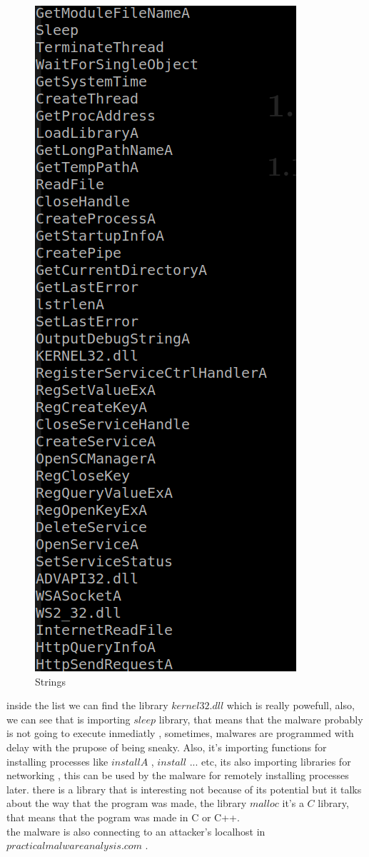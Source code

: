 \documentclass[12pt,letter]{article} %
\begin{document}
            \begin{figure}[h!]
                \centering
                \includegraphics[width=0.4\linewidth]{strings.png}
                \caption{Strings}
                \label{strings}
            \end{figure}
            inside the list we can find the library $ kernel32.dll  $ which is
            really powefull, also, we can see that is importing $ sleep  $
            library, that means that the malware probably is not going to
            execute inmediatly , sometimes, malwares are programmed with delay
            with the prupose of being sneaky. Also, it's importing functions
            for installing processes like $ installA  $ , $ install  $ ... etc,
            its also importing libraries for networking
            , this can be used by the malware for remotely installing processes later.
            there is a library that is interesting not because of its
            potential but it talks about the way that the program was made, the
            library $ malloc  $ it's a $ C  $ library, that means that the
            pogram was made in C or C++.
            \\ the malware is also connecting to an attacker's localhost in $
            practicalmalwareanalysis.com  $ .
\end{document}
